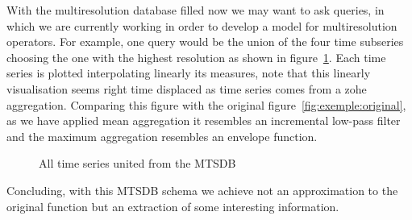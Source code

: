 %   



With the multiresolution database filled now we may want to ask
queries, in which we are currently working in order to develop a model
for multiresolution operators.  For example, one query would be the
union of the four time subseries choosing the one with the highest
resolution as shown in figure~\ref{fig:exemple:4mrdtot}.  
Each time series is plotted interpolating linearly its measures, note
that this linearly visualisation seems right time displaced as time
series comes from a zohe aggregation.  Comparing this figure with the
original figure~\ref{fig:exemple:original}, as we have applied mean
aggregation it resembles an incremental low-pass filter and the
maximum aggregation resembles an envelope function.

\begin{figure}[tp]
  \centering
  
  \caption{All time series united from the MTSDB}
  \label{fig:exemple:4mrdtot}
\end{figure}


Concluding, with this MTSDB schema we achieve not an
approximation to the original function but an extraction of some
interesting information.




